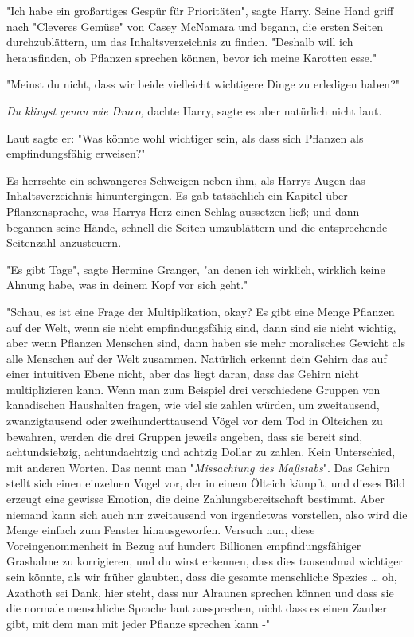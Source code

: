 {"Ich habe ein großartiges Gespür für Prioritäten", sagte Harry. Seine Hand griff nach "Cleveres Gemüse" von Casey McNamara und begann, die ersten Seiten durchzublättern, um das Inhaltsverzeichnis zu finden. "Deshalb will ich herausfinden, ob Pflanzen sprechen können, bevor ich meine Karotten esse."

"Meinst du nicht, dass wir beide vielleicht wichtigere Dinge zu erledigen haben?"

\emph{Du klingst genau wie Draco,} dachte Harry, sagte es aber natürlich nicht laut.

Laut sagte er: "Was könnte wohl wichtiger sein, als dass sich Pflanzen als empfindungsfähig erweisen?"

Es herrschte ein schwangeres Schweigen neben ihm, als Harrys Augen das Inhaltsverzeichnis hinuntergingen. Es gab tatsächlich ein Kapitel über Pflanzensprache, was Harrys Herz einen Schlag aussetzen ließ; und dann begannen seine Hände, schnell die Seiten umzublättern und die entsprechende Seitenzahl anzusteuern.

"Es gibt Tage", sagte Hermine Granger, "an denen ich wirklich, wirklich keine Ahnung habe, was in deinem Kopf vor sich geht."

"Schau, es ist eine Frage der Multiplikation, okay? Es gibt eine Menge Pflanzen auf der Welt, wenn sie nicht empfindungsfähig sind, dann sind sie nicht wichtig, aber wenn Pflanzen Menschen sind, dann haben sie mehr moralisches Gewicht als alle Menschen auf der Welt zusammen. Natürlich erkennt dein Gehirn das auf einer intuitiven Ebene nicht, aber das liegt daran, dass das Gehirn nicht multiplizieren kann. Wenn man zum Beispiel drei verschiedene Gruppen von kanadischen Haushalten fragen, wie viel sie zahlen würden, um zweitausend, zwanzigtausend oder zweihunderttausend Vögel vor dem Tod in Ölteichen zu bewahren, werden die drei Gruppen jeweils angeben, dass sie bereit sind, achtundsiebzig, achtundachtzig und achtzig Dollar zu zahlen. Kein Unterschied, mit anderen Worten. Das nennt man "\emph{Missachtung des Maßstabs}". Das Gehirn stellt sich einen einzelnen Vogel vor, der in einem Ölteich kämpft, und dieses Bild erzeugt eine gewisse Emotion, die deine Zahlungsbereitschaft bestimmt. Aber niemand kann sich auch nur zweitausend von irgendetwas vorstellen, also wird die Menge einfach zum Fenster hinausgeworfen. Versuch nun, diese Voreingenommenheit in Bezug auf hundert Billionen empfindungsfähiger Grashalme zu korrigieren, und du wirst erkennen, dass dies tausendmal wichtiger sein könnte, als wir früher glaubten, dass die gesamte menschliche Spezies … oh, Azathoth sei Dank, hier steht, dass nur Alraunen sprechen können und dass sie die normale menschliche Sprache laut aussprechen, nicht dass es einen Zauber gibt, mit dem man mit jeder Pflanze sprechen kann -"

}
